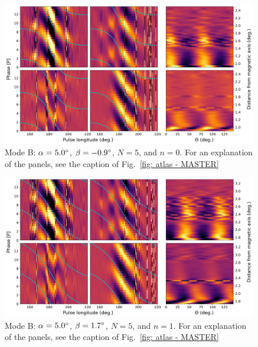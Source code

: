 \begin{figure}
	\begin{center}
		\includegraphics[width=\atlasHeightFrac\textwidth]{Figures/B0031/atlas/B_517005005000_plots}
		\caption[Atlas results: Mode B -- $\alpha=5.0\degr$, $\beta=-0.9\degr$, $N=5$, $n=0$]{Mode B: $\alpha=5.0\degr$, $\beta=-0.9\degr$, $N=5$, and $n=0$. For an explanation of the panels, see the caption of Fig.~\ref{fig: atlas - MASTER} }
		\label{fig: atlas - B_517005005000}
	\end{center}
\end{figure}

\begin{figure}
	\begin{center}
		\includegraphics[width=\atlasHeightFrac\textwidth]{Figures/B0031/atlas/B_517005005001_plots}
		\caption[Atlas results: Mode B -- $\alpha=5.0\degr$, $\beta=1.7\degr$, $N=5$, $n=1$]{Mode B: $\alpha=5.0\degr$, $\beta=1.7\degr$, $N=5$, and $n=1$. For an explanation of the panels, see the caption of Fig.~\ref{fig: atlas - MASTER} }
		\label{fig: atlas - B_517005005001}
	\end{center}
\end{figure}

